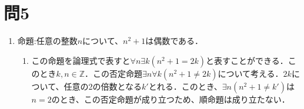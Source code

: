 \documentclass[uplatex]{jsarticle}
\begin{document}
\section{問5}
\begin{enumerate}
	\item 命題:任意の整数$n$について、$n^2 + 1$は偶数である．
		\begin{enumerate}
			\item この命題を論理式で表すと$\forall n\exists k (n^2 + 1 = 2k)$と表すことができる．このとき$k,n \in \mathbb{Z}$．この否定命題$\exists n \forall k (n^2 + 1 \neq 2k)$について考える．$2k$について、任意の2の倍数となる$k'$とれる．このとき、$\exists n (n^2 + 1 \neq k')$は$n = 2$のとき、この否定命題が成り立つため、順命題は成り立たない．
		\end{enumerate}
\end{enumerate}
\end{document}
